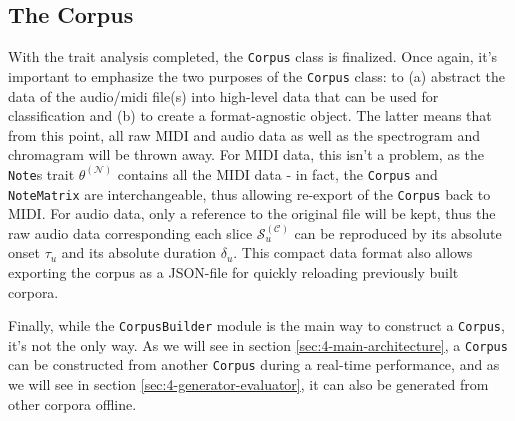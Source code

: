 \subsection{The Corpus}
With the trait analysis completed, the \texttt{Corpus} class is finalized. Once again, it's important to emphasize the two purposes of the \texttt{Corpus} class: to (a) abstract the data of the audio/midi file(s) into high-level data that can be used for classification and (b) to create a format-agnostic object. The latter means that from this point, all raw MIDI and audio data as well as the spectrogram and chromagram will be thrown away. For MIDI data, this isn't a problem, as the \texttt{Note}s trait $\theta^{(\mathcal N)}$ contains all the MIDI data - in fact, the \texttt{Corpus} and \texttt{NoteMatrix} are interchangeable, thus allowing re-export of the \texttt{Corpus} back to MIDI. For audio data, only a reference to the original file will be kept, thus the raw audio data corresponding each slice $\mathcal S^{(\mathcal C)}_u$ can be reproduced by its absolute onset $\tau_u$ and its absolute duration $\delta_u$. This compact data format also allows exporting the corpus as a JSON-file for quickly reloading previously built corpora.

Finally, while the \texttt{CorpusBuilder} module is the main way to construct a \texttt{Corpus}, it's not the only way. As we will see in section \ref{sec:4-main-architecture}, a \texttt{Corpus} can be constructed from another \texttt{Corpus} during a real-time performance, and as we will see in section \ref{sec:4-generator-evaluator}, it can also be generated from other corpora offline.